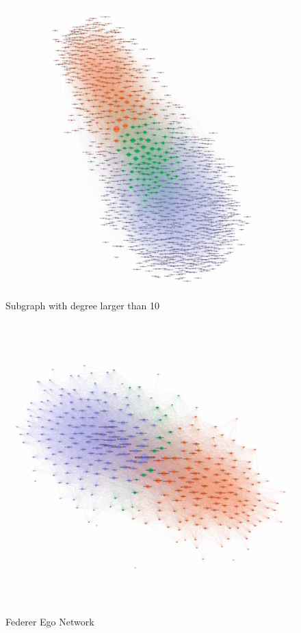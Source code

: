 \documentclass[runningheads]{llncs}
\begin{document}
\begin{figure}[H]
\centering
\includegraphics[scale=0.05]{1_subgraph}
\caption{Subgraph with degree larger than 10} \label{fig_1_subgraph}
\end{figure}

\begin{figure}[H]
\centering
\includegraphics[scale=0.1]{2_ego_FEDERER}
\caption{Federer Ego Network} \label{fig_2_ego_FEDERER}
\end{figure}
\end{document}
